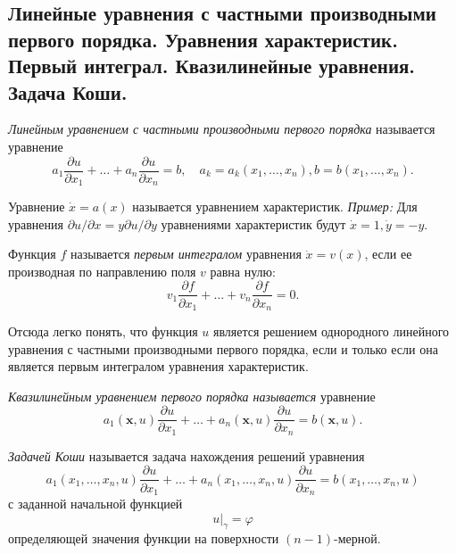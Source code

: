 \subsection{Линейные уравнения с частными производными первого порядка. Уравнения характеристик. Первый интеграл. Квазилинейные уравнения. Задача Коши.}
\label{firstorder_lineq}


\textit{Линейным уравнением с частными производными первого порядка} называется уравнение 
\begin{equation*}
	a_1 \frac{\partial u}{\partial x_1} + \dotsc + a_n \frac{\partial u}{\partial x_n} = b, \quad a_k = a_k(x_1, \dotsc, x_n), b = b(x_1, \dotsc, x_n).
\end{equation*}

Уравнение $\dot{x} = a(x)$ называется уравнением характеристик.
\textit{Пример:} Для уравнения $\partial u / \partial x = y \partial u / \partial y$ уравнениями характеристик будут $\dot{x} = 1, \dot{y} = -y$. 

Функция $f$ называется \textit{первым интегралом} уравнения $\dot{x} = v(x)$, если ее производная по направлению поля $v$ равна нулю:
\begin{equation*}
	v_1 \frac{\partial f}{\partial x_1} + \dotsc + v_n \frac{\partial f}{\partial x_n} = 0.
\end{equation*}

Отсюда легко понять, что функция $u$ является решением однородного линейного уравнения с частными производными первого порядка, если и только если она является первым интегралом уравнения характеристик. 

\textit{Квазилинейным уравнением первого порядка называется} уравнение
\begin{equation*}
	a_1(\textbf{x}, u) \frac{\partial u}{\partial x_1} + \dotsc + a_n(\textbf{x}, u) \frac{\partial u}{\partial x_n} = b(\textbf{x}, u).
\end{equation*}

\textit{Задачей Коши} называется задача нахождения решений уравнения 
\begin{equation*}
	a_1(x_1, \dotsc, x_n, u) \frac{\partial u}{\partial x_1} + \dotsc + a_n(x_1, \dotsc, x_n, u) \frac{\partial u}{\partial x_n} = b(x_1, \dotsc, x_n, u) 
\end{equation*}
с заданной начальной функцией
\begin{equation*}
	u|_{
	\gamma} = \varphi
\end{equation*}
определяющей значения функции на поверхности $(n - 1)$-мерной.
